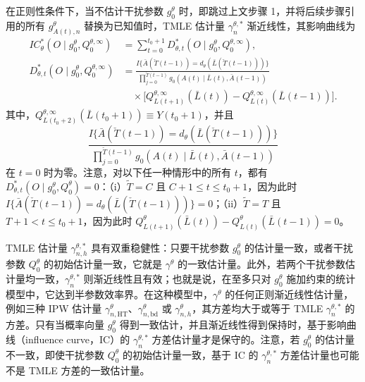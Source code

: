 在正则性条件下，当不估计干扰参数 $g_0^\theta$ 时，即跳过上文步骤 1，并将后续步骤引用的所有 $g^\theta_{A(t),n}$ 替换为已知值时，TMLE 估计量 $\gamma^{\theta,*}_n$ 渐近线性，其影响曲线为
\begin{equation}
\begin{aligned}
 IC_\theta^*(O\mid g_0^\theta,Q_0^{\theta,\infty})
 &=\sum_{t=0}^{t_0+1}D_{\theta,t}^*(O\mid g_0^\theta,Q_0^{\theta,\infty}),\\
 D_{\theta,t}^*(O\mid g_0^\theta,Q_0^{\theta,\infty})
 &=\frac{I\{\bar A(\check T(t-1))=d_\theta(\bar L(\check T(t-1)))\}}
 {\displaystyle\prod_{j=0}^{\check T(t-1)}g_0(A(t)\mid\bar L(t),\bar A(t-1))}\\
 &\quad\times\bigl[Q^{\theta,\infty}_{L(t+1)}(\bar L(t))
 -Q^{\theta,\infty}_{L(t)}(\bar L(t-1))\bigr].
\end{aligned}
\tag{16.7}
\end{equation}
其中，$Q^{\theta,\infty}_{L(t_0+2)}(\bar L(t_0+1))\equiv Y(t_0+1)$，并且
\[
 \frac{I\{\bar A(\check T(t-1))=d_\theta(\bar L(\check T(t-1)))\}}
 {\prod_{j=0}^{\check T(t-1)}g_0(A(t)\mid\bar L(t),\bar A(t-1))}
\]
在 $t=0$ 时为零。注意，对以下任一种情形中的所有 $t$，都有 $D_{\theta,t}^*(O\mid g_0^\theta,Q_0^\theta)=0$：（i）$\widetilde T=C$ 且 $C+1\leq t\leq t_0+1$，因为此时 $I\{\bar A(\check T(t-1))=d_\theta(\bar L(\check T(t-1)))\}=0$；（ii）$\widetilde T=T$ 且 $T+1<t\leq t_0+1$，因为此时 $Q^\theta_{L(t+1)}(\bar L(t))-Q^\theta_{L(t)}(\bar L(t-1))=0$。

TMLE 估计量 $\gamma^{\theta,*}_{n,h}$ 具有双重稳健性：只要干扰参数 $g_0^\theta$ 的估计量一致，或者干扰参数 $Q_0^\theta$ 的初始估计量一致，它就是 $\gamma^\theta$ 的一致估计量。此外，若两个干扰参数估计量均一致，$\gamma^{\theta,*}_n$ 则渐近线性且有效；也就是说，在至多只对 $g_0^\theta$ 施加约束的统计模型中，它达到半参数效率界。在这种模型中，$\gamma^\theta$ 的任何正则渐近线性估计量，例如三种 IPW 估计量 $\gamma^\theta_{n,\mathrm{HT}}$、$\gamma^\theta_{n,\mathrm{bd}}$ 或 $\gamma^\theta_{n,h}$，其方差均大于或等于 TMLE $\gamma^{\theta,*}_n$ 的方差。只有当概率向量 $g_0^\theta$ 得到一致估计，并且渐近线性得到保持时，基于影响曲线（influence curve，IC）的 $\gamma^{\theta,*}_n$ 方差估计量才是保守的。注意，若 $g_0^\theta$ 的估计量不一致，即使干扰参数 $Q_0^\theta$ 的初始估计量一致，基于 IC 的 $\gamma^{\theta,*}_n$ 方差估计量也可能不是 TMLE 方差的一致估计量。
